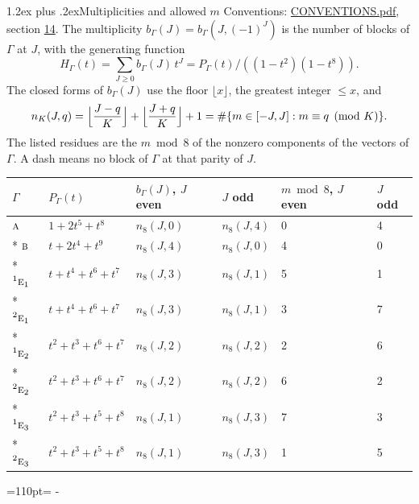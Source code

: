 \documentclass[10pt,a4paper]{article}
\makeatletter
\renewcommand\section{\@startsection{section}{1}{\z@}{-3ex plus -1ex minus -.2ex}%
  {1.2ex plus .2ex}{\normalfont\large\sffamily\bfseries\color{parttitle}}}
\newcommand{\needspace}[1]{\par\penalty-100\begingroup\dimen0=#1\relax\dimen2=\pagegoal
  \advance\dimen2-\pagetotal\ifdim\dimen0>\dimen2\relax\ifdim\dimen2>0pt\vfil\break\fi\fi
  \endgroup}
\numberwithin{equation}{section}
\newcommand{\irr}[1]{\text{\normalfont\scshape #1}}
\newcommand{\conjpair}[1]{{}^{#1}}
\makeatother
\begin{document}
\section{Multiplicities and allowed \texorpdfstring{$m$}{m}}\label{s:multiplicities}
Conventions: \href{../../CONVENTIONS.pdf}{CONVENTIONS.pdf}, section \href{../../CONVENTIONS.pdf\#conv.14}{14}.
\leavevmode\label{n:function.generating}\label{n:index.generating.variable}\label{n:function.generating.numerator}The multiplicity $b_\Gamma(J) = b_\Gamma(J, (-1)^J)$ is the number of blocks of $\Gamma$ at $J$, with the generating function
\begin{equation}\label{e:gf}H_\Gamma(t) = \sum_{J\ge0} b_\Gamma(J)\,t^J = P_\Gamma(t)/((1-t^{2})(1-t^{8})).\end{equation}
\leavevmode\label{n:delimiter.floor}\label{n:local.floor.x}\label{n:function.count}\label{n:index.modulus.K}\label{n:index.residue}The closed forms of $b_\Gamma(J)$ use the floor $\lfloor x\rfloor$, the greatest integer $\le x$, and
\begin{equation}\label{e:count}n_K(J,q) = \Bigl\lfloor\frac{J-q}{K}\Bigr\rfloor + \Bigl\lfloor\frac{J+q}{K}\Bigr\rfloor + 1 = \#\{m\in[-J,J] : m\equiv q \pmod{K}\}.\end{equation}
\leavevmode\label{n:head.parity}The listed residues are the $m \bmod 8$ of the nonzero components of the vectors of $\Gamma$. A dash means no block of $\Gamma$ at that parity of $J$.
{\small\begin{longtable}{@{}llllll@{}}\toprule
$\Gamma$ & $P_\Gamma(t)$ & $b_\Gamma(J)$, $J$ even & $J$ odd & $m \bmod 8$, $J$ even & $J$ odd\\\midrule\endhead
\bottomrule\endfoot\endlastfoot
$\irr{a}$ & $1 + 2t^{5} + t^{8}$ & $n_{8}(J,0)$ & $n_{8}(J,4)$ & 0 & 4\\*
$\irr{b}$ & $t + 2t^{4} + t^{9}$ & $n_{8}(J,4)$ & $n_{8}(J,0)$ & 4 & 0\\*
$\conjpair{1}\irr{e}_{1}$ & $t + t^{4} + t^{6} + t^{7}$ & $n_{8}(J,3)$ & $n_{8}(J,1)$ & 5 & 1\\*
$\conjpair{2}\irr{e}_{1}$ & $t + t^{4} + t^{6} + t^{7}$ & $n_{8}(J,3)$ & $n_{8}(J,1)$ & 3 & 7\\*
$\conjpair{1}\irr{e}_{2}$ & $t^{2} + t^{3} + t^{6} + t^{7}$ & $n_{8}(J,2)$ & $n_{8}(J,2)$ & 2 & 6\\*
$\conjpair{2}\irr{e}_{2}$ & $t^{2} + t^{3} + t^{6} + t^{7}$ & $n_{8}(J,2)$ & $n_{8}(J,2)$ & 6 & 2\\*
$\conjpair{1}\irr{e}_{3}$ & $t^{2} + t^{3} + t^{5} + t^{8}$ & $n_{8}(J,1)$ & $n_{8}(J,3)$ & 7 & 3\\*
$\conjpair{2}\irr{e}_{3}$ & $t^{2} + t^{3} + t^{5} + t^{8}$ & $n_{8}(J,1)$ & $n_{8}(J,3)$ & 1 & 5\\
\bottomrule\end{longtable}}
\needspace{110pt}
\end{document}
